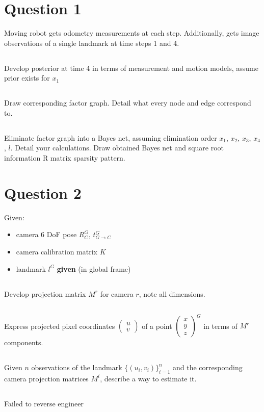\documentclass[a4paper]{scrreprt}
\begin{document}
\chapter{Question 1}
Moving robot gets odometry measurements at each step. Additionally, gets image 
observations of a single landmark at time steps 1 and 4. 
\section{}
Develop posterior at time 4 in terms of measurement and motion models, assume 
prior exists for $x_1$
\section{} 
Draw corresponding factor graph. Detail what every node and edge correspond to. 
\section{}
Eliminate factor graph into a Bayes net, assuming elimination order $x_1$, 
$x_2$, $x_3$, $x_4$, $l$. Detail your calculations. Draw obtained Bayes net and 
square root information R matrix sparsity pattern.

\chapter{Question 2}
Given: 
\begin{itemize}
\item camera 6 DoF pose $R_C^G$, $t_{G\to C}^G$
\item camera calibration matrix $K$
\item landmark $l^G$ \textbf{given} (in global frame)
\end{itemize}
\section{}
Develop projection matrix $M^r$ for camera $r$, 
note all dimensions. 

\section{}
Express projected pixel coordinates $\begin{pmatrix}
u \\ v 
\end{pmatrix}$ of a point $\begin{pmatrix}
x\\y\\z
\end{pmatrix}^G$
in terms of $M^r$ components. 

\section{}
Given $n$ observations of the landmark $\{(u_i, v_i)\}_{i=1}^n$ and the 
corresponding camera projection matrices $M^i$, describe a way 
to estimate it. 
\section{}
Failed to reverse engineer
\end{document}

